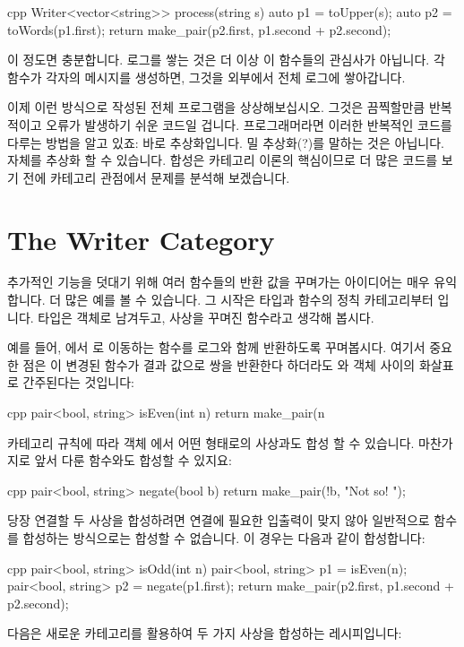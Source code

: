\begin{snip}{cpp}
Writer<vector<string>> process(string s) {
    auto p1 = toUpper(s);
    auto p2 = toWords(p1.first);
    return make_pair(p2.first, p1.second + p2.second);
}
\end{snip}
이 정도면 충분합니다. 로그를 쌓는 것은 더 이상 이 함수들의 관심사가 아닙니다. 각 함수가 각자의
메시지를 생성하면, 그것을 외부에서 전체 로그에 쌓아갑니다.

이제 이런 방식으로 작성된 전체 프로그램을 상상해보십시오. 그것은 끔찍할만큼 반복적이고 오류가
발생하기 쉬운 코드일 겁니다. 프로그래머라면 이러한 반복적인 코드를 다루는 방법을 알고 있죠:
바로 추상화입니다. 밀 추상화(?)를 말하는 것은 아닙니다.  자체를 추상화
할 수 있습니다. 합성은 카테고리 이론의 핵심이므로 더 많은 코드를 보기 전에 카테고리 관점에서
문제를 분석해 보겠습니다.

\section{The Writer Category}

추가적인 기능을 덧대기 위해 여러 함수들의 반환 값을 꾸며가는 아이디어는 매우 유익합니다. 
더 많은 예를 볼 수 있습니다. 그 시작은 타입과 함수의 정칙 카테고리부터 입니다. 타입은
객체로 남겨두고, 사상을 꾸며진 함수라고 생각해 봅시다.

예를 들어, 에서 로 이동하는  함수를 로그와
함께 반환하도록 꾸며봅시다. 여기서 중요한 점은 이 변경된 함수가 결과 값으로 쌍을 반환한다
하더라도 와  객체 사이의 화살표로 간주된다는 것입니다:

\begin{snip}{cpp}
pair<bool, string> isEven(int n) {
    return make_pair(n %
}
\end{snip}
카테고리 규칙에 따라 객체 에서 어떤 형태로의 사상과도 합성 할 수 있습니다.
마찬가지로 앞서 다룬  함수와도 합성할 수 있지요:

\begin{snip}{cpp}
pair<bool, string> negate(bool b) {
    return make_pair(!b, "Not so! ");
}
\end{snip}
당장 연결할 두 사상을 합성하려면 연결에 필요한 입출력이 맞지 않아 일반적으로 함수를 합성하는
방식으로는 합성할 수 없습니다. 이 경우는 다음과 같이 합성합니다:

\begin{snip}{cpp}
pair<bool, string> isOdd(int n) {
    pair<bool, string> p1 = isEven(n);
    pair<bool, string> p2 = negate(p1.first);
    return make_pair(p2.first, p1.second + p2.second);
}
\end{snip}
다음은 새로운 카테고리를 활용하여 두 가지 사상을 합성하는 레시피입니다:

